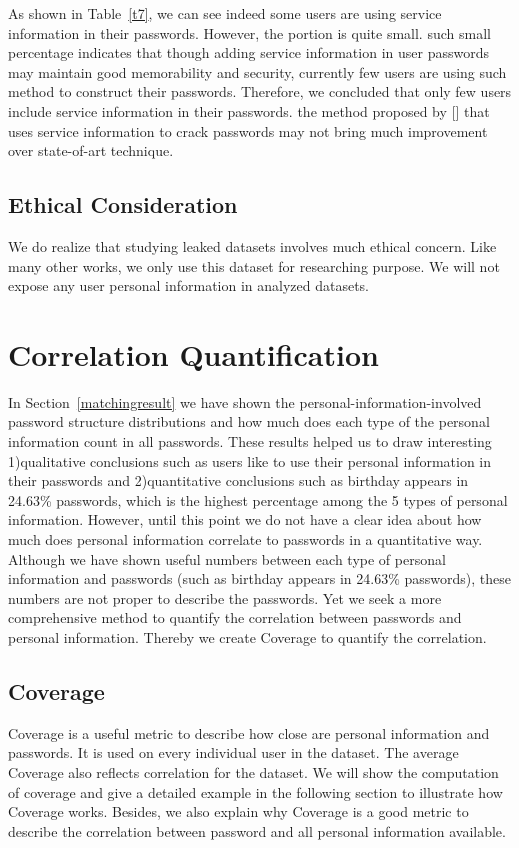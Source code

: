 \documentclass{sig-alternate}
\begin{document}
As shown in Table~\ref{t7}, we can see indeed some users are using service information in their passwords. However, the portion is quite small. such small percentage indicates that though adding service information in user passwords may maintain good memorability and security, currently few users are using such method to construct their passwords. Therefore, we concluded that only few users include service information in their passwords. the method proposed by [] that uses service information to crack passwords may not bring much improvement over state-of-art technique.


\subsection{Ethical Consideration}
We do realize that studying leaked datasets involves much ethical concern. Like many other works, we only use this dataset for researching purpose. We will not expose any user personal information in analyzed datasets.
\section{Correlation Quantification}
In Section~\ref{matchingresult} we have shown the personal-information-involved password structure distributions and how much does each type of the personal information count in all passwords. These results helped us to draw interesting 1)qualitative conclusions such as users like to use their personal information in their passwords and 2)quantitative conclusions such as birthday appears in 24.63\% passwords, which is the highest percentage among the 5 types of personal information.
However, until this point we do not have a clear idea about how much does personal information correlate to passwords in a quantitative way. Although we have shown useful numbers between each type of personal information and passwords (such as birthday appears in 24.63\% passwords), these numbers are not proper to describe the passwords. 
Yet we seek a more comprehensive method to quantify the correlation between passwords and personal information. Thereby we create Coverage to quantify the correlation. 

\subsection{Coverage}
\label{coverage}

Coverage is a useful metric to describe how close are personal information and passwords. It is used on every individual user in the dataset. The average Coverage also reflects correlation for the dataset. We will show the computation of coverage and give a detailed example in the following section to illustrate how Coverage works. Besides, we also explain why Coverage is a good metric to describe the correlation between password and all personal information available. 
\end{document}
